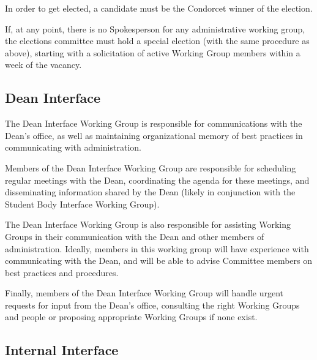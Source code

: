 \documentclass{article}
\begin{document}
In order to get elected, a candidate must be the Condorcet winner of the election. 

If, at any point, there is no Spokesperson for any administrative working group, the elections committee must hold a special election (with the same procedure as above), starting with a solicitation of active Working Group members within a week of the vacancy.

\subsection{Dean Interface} %

The Dean Interface Working Group is responsible for communications with the Dean's office, as well as maintaining organizational memory of best practices in communicating with administration.

Members of the Dean Interface Working Group are responsible for scheduling regular meetings with the Dean, coordinating the agenda for these meetings, and disseminating information shared by the Dean (likely in conjunction with the Student Body Interface Working Group). 

The Dean Interface Working Group is also responsible for assisting Working Groups in their communication with the Dean and other members of administration. Ideally, members in this working group will have experience with communicating with the Dean, and will be able to advise Committee members on best practices and procedures.

Finally, members of the Dean Interface Working Group will handle urgent requests for input from the Dean's office, consulting the right Working Groups and people or proposing appropriate Working Groups if none exist.



\subsection{Internal Interface} %
\end{document}
